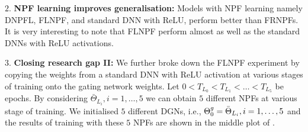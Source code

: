 $2.$ \textbf{NPF learning improves generalisation:} Models with NPF learning namely  DNPFL, FLNPF, and standard DNN with ReLU, perform better than FRNPFs. It is very interesting to note that FLNPF perform almost as well as the standard DNNs with ReLU activations. 

$3.$ \textbf{Closing research gap II:} We further broke down the FLNPF experiment by copying the weights from a standard DNN with ReLU activation at various stages of training onto the gating network weights. Let $0<T_{L_0}<T_{L_1}<\ldots<T_{L_5}$ be epochs. By considering $\bar{\Theta}_{L_i},i=1,\ldots,5$ we can obtain $5$ different NPFs at various stage of training. We initialised $5$ different DGNs, i.e., ${\Theta}^g_0=\bar{\Theta}_{L_i},i=1,\ldots,5$ and the results of training with these $5$ NPFs are shown in the middle plot of . 

